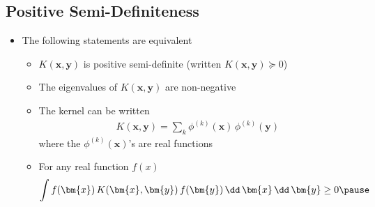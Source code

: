 
\begin{slide}
\section{Positive Semi-Definiteness}

\begin{PauseHighLight}
  \begin{itemize}
  \item The following statements are equivalent
    \begin{itemize}
    \item $K(\bm{x}, \bm{y})$ is positive semi-definite (written
      $K(\bm{x}, \bm{y})\succeq 0$)\pause
    \item The eigenvalues of $K(\bm{x}, \bm{y})$ are non-negative\pause
    \item The kernel can be written
      \begin{align*}
        K(\bm{x}, \bm{y}) = \sum_k \phi^{(k)}(\bm{x})\,\phi^{(k)}(\bm{y})
      \end{align*}
      where the $\phi^{(k)}(\bm{x})$'s are real functions\pause
    \item For any real function $f(x)$
      \begin{align*}
        \int f(\bm{x})\, K(\bm{x}, \bm{y}) \, f(\bm{y})
         \, \dd \, \bm{x}  \, \dd \, \bm{y} \geq 0\pause
      \end{align*}
    \end{itemize}
  \end{itemize}
\end{PauseHighLight}

\end{slide}



